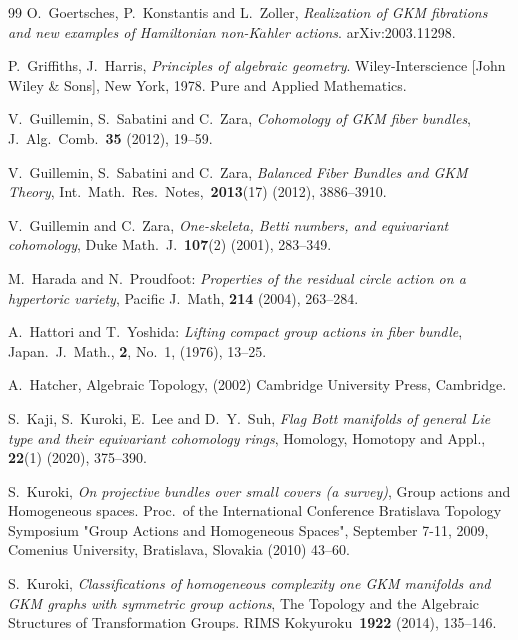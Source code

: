 \documentclass[12pt]{amsart}
\theoremstyle{definition}
\theoremstyle{remark}
\numberwithin{equation}{section}
\begin{document}
\begin{thebibliography}{99}
O.~Goertsches, P.~Konstantis and L.~Zoller,
\emph{Realization of GKM fibrations and new examples of Hamiltonian non-K{\rm$\ddot{a}$}hler actions}.
arXiv:2003.11298.

P.~Griffiths, J.~Harris,
\emph{Principles of algebraic geometry}.
Wiley-Interscience [John Wiley \& Sons], New York, 1978. Pure and Applied Mathematics.

V.~Guillemin, S.~Sabatini and C.~Zara,
\emph{Cohomology of GKM fiber bundles},
J.~Alg.~Comb.~\textbf{35} (2012), 19--59.

V.~Guillemin, S.~Sabatini and C.~Zara,
\emph{Balanced Fiber Bundles and GKM Theory},
Int.~Math.~Res.~Notes,~\textbf{2013}(17) (2012), 3886--3910.

V.~Guillemin and C.~Zara,
\emph{One-skeleta, Betti numbers, and equivariant cohomology},
Duke Math.~J.~\textbf{107}(2) (2001), 283--349.

M.~Harada and N.~Proudfoot:
\emph{Properties of the residual circle action on a hypertoric variety},
Pacific J.~Math, \textbf{214} (2004), 263--284.

A.~Hattori and T.~Yoshida:
\emph{Lifting compact group actions in fiber bundle},
Japan.~J.~Math., \textbf{2}, No.~1, (1976), 13--25.

A.~Hatcher,
Algebraic Topology, (2002)
Cambridge University Press, Cambridge.


S.~Kaji, S.~Kuroki, E.~Lee and D.~Y.~Suh,
\emph{Flag Bott manifolds of general Lie type and their equivariant cohomology rings}, Homology, Homotopy and Appl., \textbf{22}(1) (2020), 375--390.



S.~Kuroki,
\emph{On projective bundles over small covers (a survey)},
Group actions and Homogeneous spaces. Proc.~of the International Conference Bratislava Topology Symposium "Group Actions and Homogeneous Spaces", September 7-11, 2009, Comenius University, Bratislava, Slovakia (2010) 43--60.

S.~Kuroki,
\emph{Classifications of homogeneous complexity one GKM manifolds and GKM graphs with symmetric group actions},
The Topology and the Algebraic Structures of Transformation Groups. RIMS Kokyuroku~\textbf{1922} (2014), 135--146.


\end{thebibliography}
\end{document}
